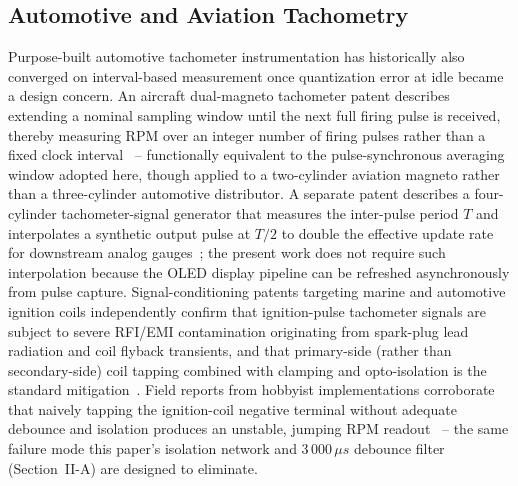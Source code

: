 \documentclass[journal, twocolumn]{IEEEtran}
\begin{document}
\subsection{Automotive and Aviation Tachometry}
Purpose-built automotive tachometer instrumentation has historically also converged on interval-based measurement once quantization error at idle became a design concern. An aircraft dual-magneto tachometer patent describes extending a nominal sampling window until the next full firing pulse is received, thereby measuring RPM over an integer number of firing pulses rather than a fixed clock interval~\cite{krattenmacher1989} -- functionally equivalent to the pulse-synchronous averaging window adopted here, though applied to a two-cylinder aviation magneto rather than a three-cylinder automotive distributor. A separate patent describes a four-cylinder tachometer-signal generator that measures the inter-pulse period $T$ and interpolates a synthetic output pulse at $T/2$ to double the effective update rate for downstream analog gauges~\cite{nissan1992}; the present work does not require such interpolation because the OLED display pipeline can be refreshed asynchronously from pulse capture. Signal-conditioning patents targeting marine and automotive ignition coils independently confirm that ignition-pulse tachometer signals are subject to severe RFI/EMI contamination originating from spark-plug lead radiation and coil flyback transients, and that primary-side (rather than secondary-side) coil tapping combined with clamping and opto-isolation is the standard mitigation~\cite{signalcond1990,twocycletach1988}. Field reports from hobbyist implementations corroborate that naively tapping the ignition-coil negative terminal without adequate debounce and isolation produces an unstable, jumping RPM readout~\cite{arduinoforum2023} -- the same failure mode this paper's isolation network and $3\,000\,\mu s$ debounce filter (Section~II-A) are designed to eliminate.
\end{document}
